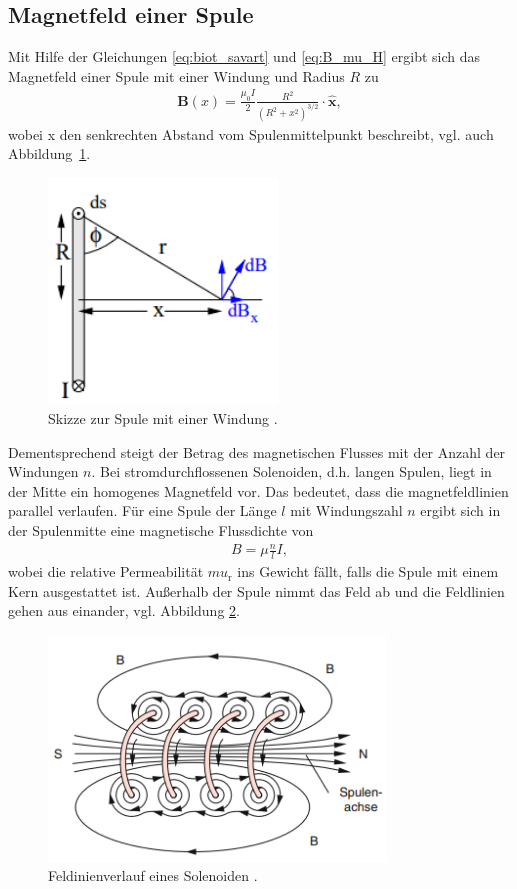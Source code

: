 \subsection{Magnetfeld einer Spule}
Mit Hilfe der Gleichungen \eqref{eq:biot_savart} und \eqref{eq:B_mu_H} ergibt sich das Magnetfeld einer Spule mit einer Windung und Radius $R$ zu
\begin{align}
    \symbf{B}(x) = \frac{\mu_0 I}{2} \frac{R^2}{\left(R^2 + x^2\right)^{3/2}} \cdot \hat{\symbf{x}},
\end{align}
wobei x den senkrechten Abstand vom Spulenmittelpunkt beschreibt, vgl. auch Abbildung~\ref{fig:spule_eine_Windung}.
%
\begin{figure}[H]
    \centering
    \includegraphics*[height = 6cm]{./abbildungen/spule_eine_windung.png}
    \caption[]{Skizze zur Spule mit einer Windung \cite{man:v308}.}
    \label{fig:spule_eine_Windung}
\end{figure}
\noindent
Dementsprechend steigt der Betrag des magnetischen Flusses mit der Anzahl der Windungen $n$.
Bei stromdurchflossenen Solenoiden, d.h. langen Spulen, liegt in der Mitte ein homogenes Magnetfeld vor.
Das bedeutet, dass die magnetfeldlinien parallel verlaufen.
Für eine Spule der Länge $l$ mit Windungszahl $n$ ergibt sich in der Spulenmitte eine magnetische Flussdichte von 
\begin{align}
    \label{eq:homogen_lange_spule}
    B = \mu \frac{n}{l} I,
\end{align}
wobei die relative Permeabilität $mu_\text{r}$ ins Gewicht fällt, falls die Spule mit einem Kern ausgestattet ist.
Außerhalb der Spule nimmt das Feld ab und die Feldlinien gehen aus einander, vgl. Abbildung \ref{fig:solenoid}.
\begin{figure}[H]
    \centering
    \includegraphics*[height = 6cm]{./abbildungen/Solenoid.png}
    \caption[]{Feldinienverlauf eines Solenoiden \cite[S. 86]{demtroeder2}.}
    \label{fig:solenoid}
\end{figure}

\noindent

